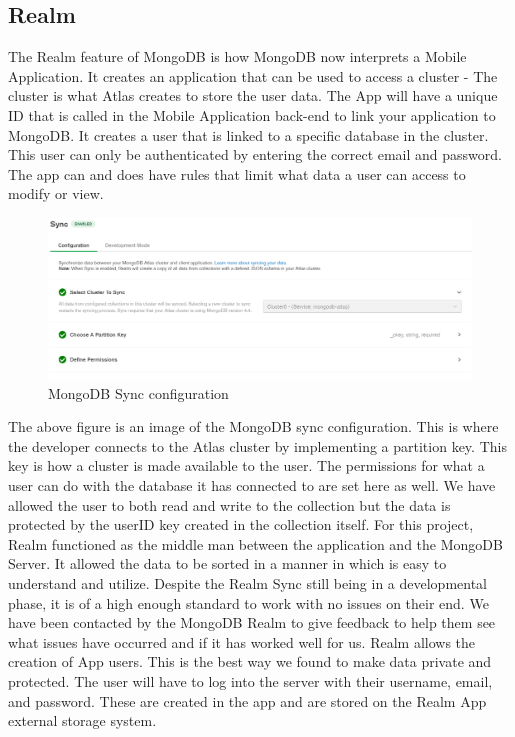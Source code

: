 \subsection{Realm}
The Realm feature of MongoDB is how MongoDB now interprets a Mobile Application. It creates an application that can be used to access a cluster - The cluster is what Atlas creates to store the user data.
\newline
The App will have a unique ID that is called in the Mobile Application back-end to link your application to MongoDB. It creates a user that is linked to a specific database in the cluster. This user can only be authenticated by entering the correct email and password. The app can and does have rules that limit what data a user can access to modify or view.
\begin{figure}[H]
    \centering
    \includegraphics[width=15cm]{img/syncSetup.PNG}
    \caption{MongoDB Sync configuration}
    \label{fig:altas config}
\end{figure}
The above figure is an image of the MongoDB sync configuration. This is where the developer connects to the Atlas cluster by implementing a partition key. This key is how a cluster is made available to the user. The permissions for what a user can do with the database it has connected to are set here as well. We have allowed the user to both read and write to the collection but the data is protected by the userID key created in the collection itself.\newline
For this project, Realm functioned as the middle man between the application and the MongoDB Server. It allowed the data to be sorted in a manner in which is easy to understand and utilize. Despite the Realm Sync still being in a developmental phase, it is of a high enough standard to work with no issues on their end. \newline
We have been contacted by the MongoDB Realm to give feedback to help them see what issues have occurred and if it has worked well for us.
Realm allows the creation of App users. This is the best way we found to make data private and protected. The user will have to log into the server with their username, email, and password. These are created in the app and are stored on the Realm App external storage system.

